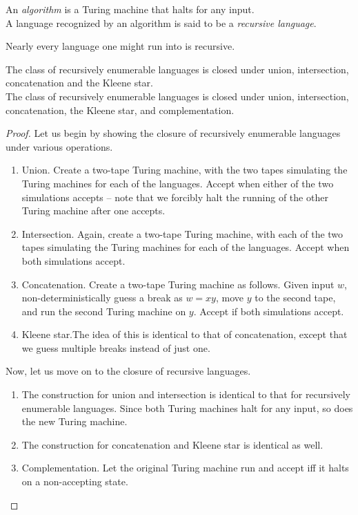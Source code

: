 	\begin{definition}[Algorithm]
		An \emph{algorithm} is a Turing machine that halts for any input.\\
		A language recognized by an algorithm is said to be a \emph{recursive language}.
	\end{definition}

	Nearly every language one might run into is recursive.

	\begin{ftheo}
		The class of recursively enumerable languages is closed under union, intersection, concatenation and the Kleene star.\\
		The class of recursively enumerable languages is closed under union, intersection, concatenation, the Kleene star, and complementation.
	\end{ftheo}
	\begin{proof}
		Let us begin by showing the closure of recursively enumerable languages under various operations.
		\begin{enumerate}
			\item Union. Create a two-tape Turing machine, with the two tapes simulating the Turing machines for each of the languages. Accept when either of the two simulations accepts -- note that we forcibly halt the running of the other Turing machine after one accepts.
			\item Intersection. Again, create a two-tape Turing machine, with each of the two tapes simulating the Turing machines for each of the languages. Accept when both simulations accept.
			\item Concatenation. Create a two-tape Turing machine as follows. Given input $w$, non-deterministically guess a break as $w=xy$, move $y$ to the second tape, and run the second Turing machine on $y$. Accept if both simulations accept.
			\item Kleene star.The idea of this is identical to that of concatenation, except that we guess multiple breaks instead of just one.
		\end{enumerate}
		Now, let us move on to the closure of recursive languages.
		\begin{enumerate}
			\item The construction for union and intersection is identical to that for recursively enumerable languages. Since both Turing machines halt for any input, so does the new Turing machine.
			\item The construction for concatenation and Kleene star is identical as well. %
			\item Complementation. Let the original Turing machine run and accept iff it halts on a non-accepting state.
		\end{enumerate}
	\end{proof}


